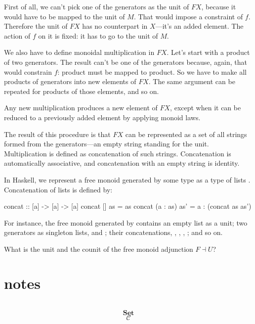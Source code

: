 \documentclass[DaoFP]{subfiles}
\begin{document}
First of all, we can't pick one of the generators as the unit of $F X$, because it would have to be mapped to the unit of $M$. That would impose a constraint of $f$. Therefore the unit of $F X$ has no counterpart in $X$---it's an added element. The action of $f$ on it is fixed: it has to go to the unit of $M$. 

We also have to define monoidal multiplication in $F X$. Let's start with a product of two generators. The result can't be one of the generators because, again, that would constrain $f$: product must be mapped to product. So we have to make all products of generators into new elements of $F X$. The same argument can be repeated for products of those elements, and so on. 

Any new multiplication produces a new element of $F X$, except when it can be reduced to a previously added element by applying monoid laws. 

The result of this procedure is that $F X$ can be represented as a set of all strings formed from the generators---an empty string standing for the unit. Multiplication is defined as concatenation of such strings. Concatenation is automatically associative, and concatenation with an empty string is identity. 

In Haskell, we represent a free monoid generated by some type  as a type of lists \hask{[a]}. Concatenation of lists is defined by:
\begin{haskell}
concat :: [a] -> [a] -> [a]
concat [] as = as
concat (a : as) as' = a : (concat as as')
\end{haskell}

For instance, the free monoid generated by  contains an empty list \hask{[]} as a unit; two generators as singleton lists, \hask{[True]} and \hask{[False]}; their concatenations, , , , ; and so on.

\begin{exercise}
What is the unit and the counit of the free monoid adjunction $F \dashv U$?
\end{exercise}


\section{notes}


\begin{exercise}
\end{exercise}
\begin{haskell}
\end{haskell}
\[
 \begin{tikzcd}
  \end{tikzcd}
\]

\[   \mathbf{Set} \]
\[   \mathcal{C} \]
\end{document}
